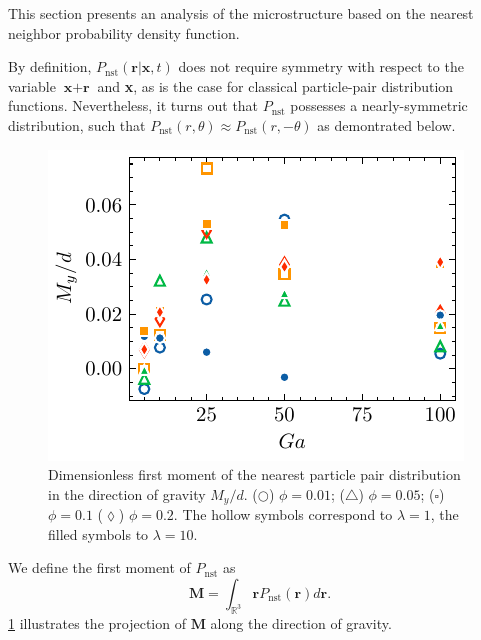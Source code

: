 This section presents an analysis of the microstructure based on the nearest neighbor probability density function. 


By definition, $P_\text{nst}(\textbf{r}|\textbf{x},t)$ does not require symmetry with respect to the variable $\textbf{x}+\textbf{r}$ and \textbf{x}, as is the case for classical particle-pair distribution functions. 
Nevertheless, it turns out that $P_\text{nst}$ possesses a nearly-symmetric distribution, such that  $P_\text{nst}(r,\theta)\approx P_\text{nst}(r,- \theta)$ as demontrated below.
\begin{figure}[h!]
    \centering
    \includegraphics[height = 0.3\textwidth]{image/HOMOGENEOUS_NEW/PA/Ry.pdf}
    \caption{ Dimensionless first moment of the nearest particle pair distribution in the direction of gravity $M_y/d$. 
    ($\pmb\bigcirc$) $\phi = 0.01$; ($\pmb\triangle$) $ \phi = 0.05$; ($\pmb\square$) $\phi = 0.1$ ($\pmb\lozenge$) $\phi = 0.2$.
    The hollow symbols correspond to $\lambda = 1$, the filled symbols to $\lambda = 10$.
    }
    \label{fig:ap:RY}
\end{figure}
We define the first moment of $P_\text{nst}$ as
\begin{equation}
 \textbf{M} = \int_{\mathbb{R}^3} \textbf{r} P_\text{nst}(\textbf{r}) d\textbf{r}.
\end{equation}
\ref{fig:ap:RY} illustrates the projection of $\textbf{M}$ along the direction of gravity. 

